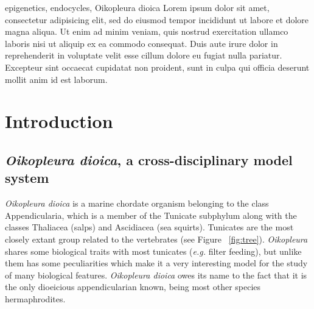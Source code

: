 \documentclass[11pt,twoside,a4paper]{report}
\begin{document}
\cleardoublepage


\TitlePage
    \vspace*{55mm}
        {epigenetics, endocycles, Oikopleura dioica}
		{Lorem ipsum dolor sit amet, consectetur adipisicing elit, sed do eiusmod tempor incididunt ut labore et dolore magna aliqua. Ut enim ad minim veniam, quis nostrud exercitation ullamco laboris nisi ut aliquip ex ea commodo consequat. Duis aute irure dolor in reprehenderit in voluptate velit esse cillum dolore eu fugiat nulla pariatur. Excepteur sint occaecat cupidatat non proident, sunt in culpa qui officia deserunt mollit anim id est laborum.}
\EndTitlePage

\cleardoublepage



\tableofcontents

\listoffigures

\listoftables

\cleardoublepage
\chapter{Introduction}

	\section{\textit{Oikopleura dioica}, a cross-disciplinary model system}
		\textit{Oikopleura dioica} is a marine chordate organism belonging to the class Appendicularia, which is a member of the Tunicate subphylum along with the classes Thaliacea (salps) and Ascidiacea (sea squirts). Tunicates are the most closely extant group related to the vertebrates (see Figure ~\ref{fig:tree}). \textit{Oikopleura} shares some biological traits with most tunicates (\textit{e.g.} filter feeding), but unlike them has some peculiarities which make it a very interesting model for the study of many biological features. \textit{Oikopleura dioica} owes its name to the fact that it is the only dioeicious appendicularian known, being most other species hermaphrodites.
		
\end{document}
